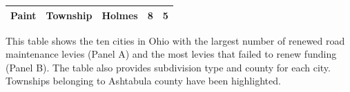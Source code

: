 \begin{table}[ht]
\begin{threeparttable}
\begin{tabular}{p{4cm}p{3cm}p{3cm}cc}
        Paint & Township & Holmes & 8 & 5 \\
        \hline
    \end{tabular}
    \begin{tablenotes}
        \small
        \item This table shows the ten cities in Ohio with the largest number of renewed road maintenance levies (Panel A) and the most levies that failed to renew funding (Panel B). The table also provides subdivision type and county for each city. Townships belonging to Ashtabula county have been highlighted.  
    \end{tablenotes}
    \end{threeparttable}
\end{table}


